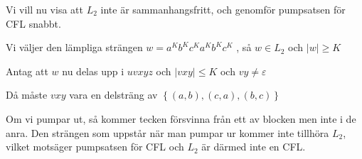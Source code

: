 \par\bigskip
\noindent Vi vill nu visa att $L_2$ inte är sammanhangsfritt, och genomför pumpsatsen för CFL snabbt.\par
\noindent Vi väljer den lämpliga strängen $w = a^Kb^Kc^Ka^Kb^Kc^K$ , så $w\in L_2$ och $\left|w\right|\geq K$\par
\noindent Antag att $w$ nu delas upp i $uvxyz$ och $\left|vxy\right|\leq K$ och $vy\neq\varepsilon$\par
\noindent Då måste $vxy$ vara en delsträng av $\left\{(a,b),(c,a),(b,c)\right\}$\par
\noindent Om vi pumpar ut, så kommer tecken försvinna från ett av blocken men inte i de anra. Den strängen som uppstår när man pumpar ur kommer inte tillhöra $L_2$, vilket motsäger pumpsatsen för CFL och $L_2$ är därmed inte en CFL. 

